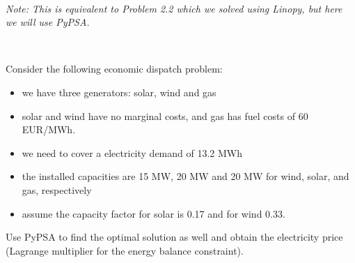 \documentclass[10pt]{article}
\newenvironment{problem}[2][Problem]{\begin{trivlist}
\item[\hskip \labelsep {\bfseries #1}\hskip \labelsep {\bfseries #2.}]}{\end{trivlist}}
\begin{document}
\

\begin{problem}{5.3}

\textit{Note: This is equivalent to Problem 2.2 which we solved using Linopy, but here we will use PyPSA.}

\

Consider the following economic dispatch problem:

\begin{itemize}
\item[-] we have three generators: solar, wind and gas

\item[-] solar and wind have no marginal costs, and gas has fuel costs of 60 EUR/MWh.

\item[-] we need to cover a electricity demand of 13.2 MWh

\item[-] the installed capacities are 15 MW, 20 MW and 20 MW for wind, solar, and gas, respectively

\item[-] assume the capacity factor for solar is 0.17 and for wind 0.33.
\end{itemize}

Use PyPSA to find the optimal solution as well and obtain the electricity price (Lagrange multiplier for the energy balance constraint).
\end{problem}

\
\end{document}
